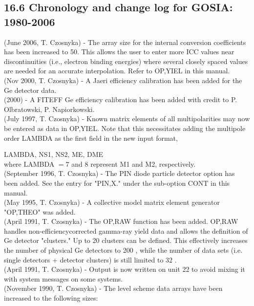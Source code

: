 \documentclass[10pt]{article}
\begin{document}
\subsection*{16.6 Chronology and change log for GOSIA: 1980-2006}
(June 2006, T. Czosnyka) - The array size for the internal conversion coefficients has been increased to 50. This allows the user to enter more ICC values near discontinuities (i.e., electron binding energies) where several closely spaced values are needed for an accurate interpolation. Refer to OP,YIEL in this manual.\\
(Nov 2000, T. Czosnyka) - A Jaeri efficiency calibration has been added for the Ge detector data.\\
(2000) - A FITEFF Ge efficiency calibration has been added with credit to P. Olbratowski, P. Napiorkowski.\\
(July 1997, T. Czosnyka) - Known matrix elements of all multipolarities may now be entered as data in OP,YIEL. Note that this necessitates adding the multipole order LAMBDA as the first field in the new input format,

LAMBDA, NS1, NS2, ME, DME\\
where LAMBDA $=7$ and 8 represent M1 and M2, respectively.\\
(September 1996, T. Czosnyka) - The PIN diode particle detector option has been added. See the entry for "PIN,X." under the sub-option CONT in this manual.\\
(May 1995, T. Czosnyka) - A collective model matrix element generator "OP,THEO" was added.\\
(April 1991, T. Czosnyka) - The OP,RAW function has been added. OP,RAW handles non-efficiencycorrected gamma-ray yield data and allows the definition of Ge detector "clusters." Up to 20 clusters can be defined. This effectively increases the number of physical Ge detectors to 200 , while the number of data sets (i.e. single detectors + detector clusters) is still limited to 32 .\\
(April 1991, T. Czosnyka) - Output is now written on unit 22 to avoid mixing it with system messages on some systems.\\
(November 1990, T. Czosnyka) - The level scheme data arrays have been increased to the following sizes:
\end{document}
